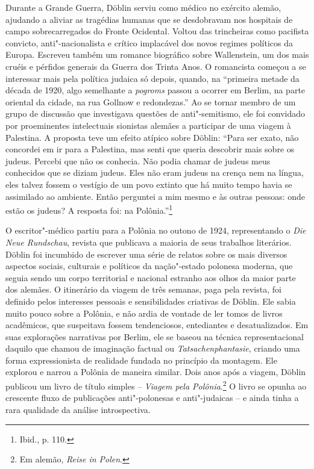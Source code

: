 Durante a Grande Guerra, Döblin serviu como médico no exército alemão,
ajudando a aliviar as tragédias humanas que se desdobravam nos hospitais
de campo sobrecarregados do Fronte Ocidental. Voltou das trincheiras
como pacifista convicto, anti"-nacionalista e crítico implacável dos
novos regimes políticos da Europa. Escreveu também um romance biográfico
sobre Wallenstein, um dos mais cruéis e pérfidos generais da Guerra dos
Trinta Anos. O romancista começou a se interessar mais pela política
judaica só depois, quando, na ``primeira metade da década de 1920, algo
semelhante a \textit{pogroms} passou a ocorrer em Berlim, na parte oriental da
cidade, na rua Gollnow e redondezas.'' Ao se tornar membro de um grupo
de discussão que investigava questões de anti"-semitismo, ele foi
convidado por proeminentes intelectuais sionistas alemães a participar
de uma viagem à Palestina. A proposta teve um efeito atípico sobre
Döblin: ``Para ser exato, não concordei em ir para a Palestina, mas
senti que queria descobrir mais sobre os judeus. Percebi que não os
conhecia. Não podia chamar de judeus meus conhecidos que se diziam
judeus. Eles não eram judeus na crença nem na língua, eles talvez fossem
o vestígio de um povo extinto que há muito tempo havia se assimilado ao
ambiente. Então perguntei a mim mesmo e às outras pessoas: onde estão os
judeus? A resposta foi: na Polônia.''\footnote{Ibid., p. 110.}

O escritor"-médico partiu para a Polônia no outono de 1924, representando
o \textit{Die Neue Rundschau}, revista que publicava a maioria de seus
trabalhos literários. Döblin foi incumbido de escrever uma série de
relatos sobre os mais diversos aspectos sociais, culturais e políticos
da nação"-estado polonesa moderna, que seguia sendo um corpo territorial
e nacional estranho aos olhos da maior parte dos alemães. O itinerário
da viagem de três semanas, paga pela revista, foi definido pelos
interesses pessoais e sensibilidades criativas de Döblin. Ele sabia
muito pouco sobre a Polônia, e não ardia de vontade de ler tomos de
livros acadêmicos, que suspeitava fossem tendenciosos, entediantes e
desatualizados. Em suas explorações narrativas por Berlim, ele se baseou
na técnica representacional daquilo que chamou de imaginação factual ou 
\textit{Tatsachenphantasie}, criando uma forma expressionista de
realidade fundada no princípio da montagem. Ele explorou e narrou a
Polônia de maneira similar. Dois anos após a viagem, Döblin publicou um
livro de título simples -- \textit{Viagem pela
Polônia}.\footnote{Em alemão, \textit{Reise in Polen}.} O livro se opunha ao crescente fluxo de publicações
anti"-polonesas e anti"-judaicas -- e ainda tinha a rara qualidade da
análise introspectiva.

